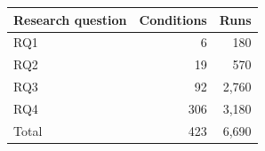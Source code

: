 \begin{tabular}{lrr}
\toprule
Research question & Conditions & Runs \\
\midrule
RQ1 & 6 & 180 \\
RQ2 & 19 & 570 \\
RQ3 & 92 & 2,760 \\
RQ4 & 306 & 3,180 \\
\midrule
Total & 423 & 6,690 \\
\bottomrule
\end{tabular}
